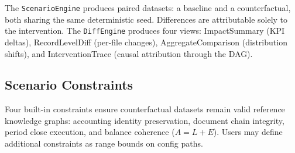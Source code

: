 The \texttt{ScenarioEngine} produces paired datasets: a baseline and a
counterfactual, both sharing the same deterministic seed.  Differences
are attributable solely to the intervention.  The \texttt{DiffEngine}
produces four views: ImpactSummary (KPI deltas), RecordLevelDiff
(per-file changes), AggregateComparison (distribution shifts), and
InterventionTrace (causal attribution through the DAG).

\subsection{Scenario Constraints}
\label{sec:cf_constraints}

Four built-in constraints ensure counterfactual datasets remain valid
reference knowledge graphs: accounting identity preservation, document
chain integrity, period close execution, and balance coherence
($A = L + E$).  Users may define additional constraints as range bounds
on config paths.
